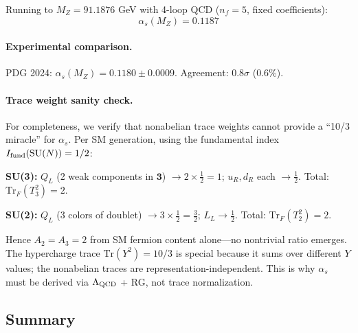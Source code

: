 Running to $M_Z = 91.1876$ GeV with 4-loop QCD ($n_f = 5$, fixed coefficients):
\begin{equation}
\boxed{\alpha_s(M_Z) = 0.1187}
\end{equation}

\paragraph{Experimental comparison.}
PDG 2024: $\alpha_s(M_Z) = 0.1180 \pm 0.0009$. 
Agreement: \textbf{$0.8\sigma$} (0.6\%).

\paragraph{Trace weight sanity check.}
For completeness, we verify that nonabelian trace weights cannot provide a 
``10/3 miracle'' for $\alpha_s$. Per SM generation, using the fundamental index 
$I_{\rm fund}(\mathrm{SU}(N)) = 1/2$:

\textbf{SU(3):} $Q_L$ (2 weak components in $\mathbf{3}$) $\to 2 \times \frac{1}{2} = 1$; 
$u_R, d_R$ each $\to \frac{1}{2}$. Total: $\mathrm{Tr}_F(T_3^2) = 2$.

\textbf{SU(2):} $Q_L$ (3 colors of doublet) $\to 3 \times \frac{1}{2} = \frac{3}{2}$;
$L_L \to \frac{1}{2}$. Total: $\mathrm{Tr}_F(T_2^2) = 2$.

Hence $A_2 = A_3 = 2$ from SM fermion content alone---no nontrivial ratio emerges.
The hypercharge trace $\mathrm{Tr}(Y^2) = 10/3$ is special because it sums over 
different $Y$ values; the nonabelian traces are representation-independent.
This is why $\alpha_s$ must be derived via $\Lambda_{\rm QCD}$ + RG, not trace normalization.

\subsection{Summary}\label{app:summary-complete}

